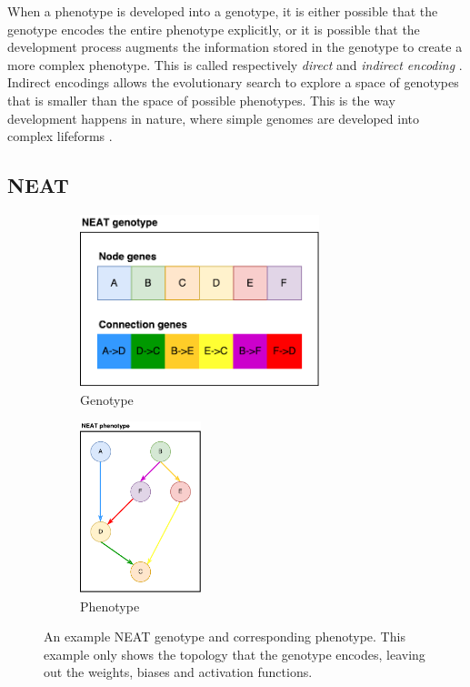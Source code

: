 When a phenotype is developed into a genotype, it is either possible that the genotype encodes the entire phenotype explicitly,
or it is possible that the development process augments the information stored in the genotype to create a more complex phenotype.
This is called respectively \textit{direct} and \textit{indirect encoding} \cite{clune2011performance}.
Indirect encodings allows the evolutionary search to explore a space of genotypes that is smaller than the space of possible phenotypes.
This is the way development happens in nature, where simple genomes are developed into complex lifeforms \cite{clune2011performance}.

\subsection{NEAT}
\begin{figure}
\centering
\begin{subfigure}[t]{.5\columnwidth}
\centering
\includegraphics[height=5cm, keepaspectratio]{fig/NEAT_gt}
\caption{Genotype}
\end{subfigure}\hfill%
\begin{subfigure}[t]{.5\columnwidth}
\centering
\includegraphics[height=5cm, keepaspectratio]{fig/NEAT_pt}
\caption{Phenotype}
\end{subfigure}
\caption[Example NEAT genotype and phenotype]{
An example NEAT genotype and corresponding phenotype.
This example only shows the topology that the genotype encodes, leaving out the weights, biases and activation functions.
}
\label{fig:neat}
\end{figure}

